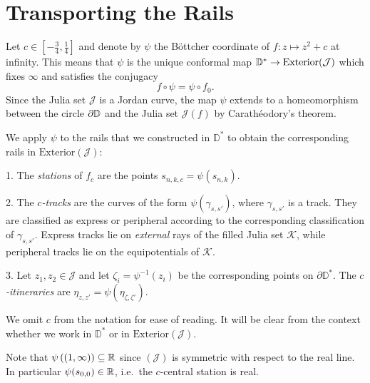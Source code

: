	
\section{Transporting the Rails} \label{rails-section}
Let $c\in\left[-\frac 34,\frac{1}{4}\right]$ and denote by $\psi$ the Böttcher coordinate of $f: z\mapsto z^2+c$ at infinity. 
This means that $\psi$ is the unique conformal map $\mathbb{D}^{*}\to\mathrm{Exterior}(\mathcal{J})$  which fixes $\infty$ and satisfies the conjugacy $$f\circ\psi=\psi\circ f_{0}.$$
Since the Julia set $\mathcal J$ is a Jordan curve, the map $\psi$ extends to a homeomorphism between the circle $\partial\mathbb{D}$ and the Julia set $\mathcal{J}(f)$ by Carathéodory's
theorem.

We apply $\psi$ to the rails that we constructed in $\mathbb D^*$ to obtain the corresponding rails in $\mathrm{Exterior}(\mathcal{J})$:
\begin{definition}

1. The 	\emph{stations} of $f_c$ are the points  $s_{n,k,c}=\psi(s_{n,k})$.

2. The \emph{$c$-tracks} are the curves of the form $\psi \left(\gamma_{s,s'}\right)$, where $\gamma_{s,s'}$ is a track. They are classified as express or peripheral according to the corresponding classification of $\gamma_{s,s'}$. 
Express tracks lie on \emph{external} rays of the filled Julia set $\mathcal K$, while peripheral tracks lie on the equipotentials of $\mathcal K$.

3. Let $z_1,z_2\in \mathcal J$ and let $\zeta_i=\psi^{-1}(z_i)$ be the corresponding points on $\partial \mathbb D^*$. 
The \emph{$c$-itineraries} are $\eta_{z,z'}=\psi(\eta_{\zeta,\zeta'})$.

We omit $c$ from the notation for ease of reading. It will be clear from the context whether we work in $\mathbb D^*$ or in $\mathrm{Exterior}(\mathcal J)$.

\end{definition}

Note that $\psi\left((1,\infty)\right)\subseteq\mathbb{R}$ since $(\mathcal{J})$ is symmetric with respect to the real line. In particular $\psi(s_{0,0})\in\mathbb{R}$, i.e.\ the $c$-central station is real.

\begin{comment}
\begin{proof}
Formally, $\overline{\psi}(\overline{z})$
	is another conformal conjugacy between $f$ and $f_0$ which fixes infinity, so by uniqueness of the Böttcher coordinate we obtain $\psi(z)=\overline{\psi}(\overline{z})$,
	hence $\psi(z)\in\R$ for $z\in\R$.
\end{proof}
\end{comment}

